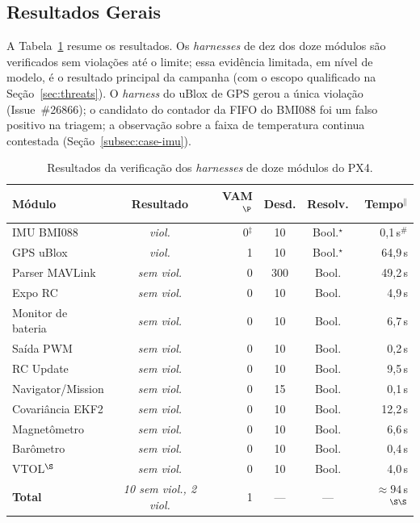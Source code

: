 \documentclass[conference]{IEEEtran}
\begin{document}
\subsection{Resultados Gerais}
\label{subsec:overall}

A Tabela~\ref{tab:results} resume os resultados. Os
\textit{harnesses} de dez dos doze módulos são verificados sem
violações até o limite; essa evidência limitada, em nível de modelo,
é o resultado principal da campanha (com o escopo qualificado na
Seção~\ref{sec:threats}).
O \textit{harness} do uBlox de GPS gerou a única violação
(Issue~\#26866); o candidato do contador da FIFO do BMI088 foi um
falso positivo na triagem; a observação sobre a faixa de temperatura
continua contestada (Seção~\ref{subsec:case-imu}).
\begin{table}[t]
\centering
\caption{Resultados da verificação dos \textit{harnesses} de doze
módulos do PX4.}
\label{tab:results}
\scriptsize
\setlength{\tabcolsep}{3pt}
\begin{tabular}{@{}lcrccr@{}}
\toprule
\textbf{Módulo} & \textbf{Resultado} & \textbf{VAM}$^\P$ & \textbf{Desd.} & \textbf{Resolv.} & \textbf{Tempo}$^\|$\\
\midrule
IMU BMI088        & \textit{viol.} & 0$^\ddagger$ & 10 & Bool.$^\star$ & 0,1\,s$^{\#}$ \\
GPS uBlox         & \textit{viol.} & 1 & 10 & Bool.$^\star$ & 64,9\,s \\
Parser MAVLink    & \textit{sem viol.} & 0 & 300 & Bool. & 49,2\,s \\
Expo RC           & \textit{sem viol.} & 0 & 10 & Bool. & 4,9\,s \\
Monitor de bateria & \textit{sem viol.} & 0 & 10 & Bool. &   6,7\,s \\
Saída PWM         & \textit{sem viol.} & 0 & 10 & Bool. &   0,2\,s \\
RC Update         & \textit{sem viol.} & 0 & 10 & Bool. &  9,5\,s \\
Navigator/Mission & \textit{sem viol.} & 0 & 15 & Bool. &   0,1\,s \\
Covariância EKF2  & \textit{sem viol.} & 0 & 10 & Bool. & 12,2\,s \\
Magnetômetro      & \textit{sem viol.} & 0 & 10 & Bool. &  6,6\,s \\
Barômetro         & \textit{sem viol.} & 0 & 10 & Bool. &   0,4\,s \\
VTOL$^\S$         & \textit{sem viol.} & 0 & 10 & Bool. &  4,0\,s \\
\midrule
\textbf{Total} & \textit{10 sem viol., 2 viol.} & 1 & --- & --- & ${\approx}94$\,s$^{\S\S}$ \\

\end{tabular}
\end{table}
\end{document}
